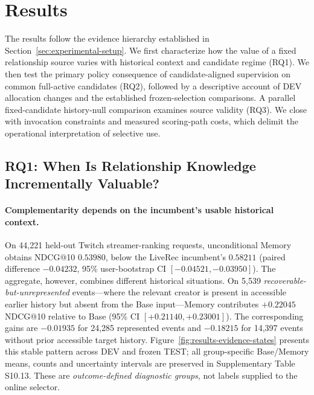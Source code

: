 \section{Results}
\label{sec:results}

The results follow the evidence hierarchy established in Section~\ref{sec:experimental-setup}. We first characterize how the value of a fixed relationship source varies with historical context and candidate regime (RQ1). We then test the primary policy consequence of candidate-aligned supervision on common full-active candidates (RQ2), followed by a descriptive account of DEV allocation changes and the established frozen-selection comparisons. A parallel fixed-candidate history-null comparison examines source validity (RQ3). We close with invocation constraints and measured scoring-path costs, which delimit the operational interpretation of selective use.

\subsection{RQ1: When Is Relationship Knowledge Incrementally Valuable?}
\label{sec:results-heterogeneity}
\label{sec:results-regimes}

\paragraph{Complementarity depends on the incumbent's usable historical context.}
On 44,221 held-out Twitch streamer-ranking requests, unconditional Memory obtains NDCG@10 $0.53980$, below the LiveRec incumbent's $0.58211$ (paired difference $-0.04232$, 95\% user-bootstrap CI $[-0.04521,-0.03950]$). The aggregate, however, combines different historical situations. On 5,539 \emph{recoverable-but-unrepresented} events—where the relevant creator is present in accessible earlier history but absent from the Base input—Memory contributes $+0.22045$ NDCG@10 relative to Base (95\% CI $[+0.21140,+0.23001]$). The corresponding gains are $-0.01935$ for 24,285 represented events and $-0.18215$ for 14,397 events without prior accessible target history. Figure~\ref{fig:results-evidence-states} presents this stable pattern across DEV and frozen TEST; all group-specific Base/Memory means, counts and uncertainty intervals are preserved in Supplementary Table S10.13. These are \emph{outcome-defined diagnostic groups}, not labels supplied to the online selector.

